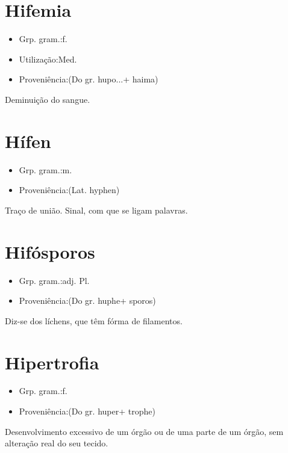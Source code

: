 \documentclass{article}
\begin{document}
\section{Hifemia}
\begin{itemize}
\item {Grp. gram.:f.}
\end{itemize}
\begin{itemize}
\item {Utilização:Med.}
\end{itemize}
\begin{itemize}
\item {Proveniência:(Do gr. \textunderscore hupo...\textunderscore  + \textunderscore haima\textunderscore )}
\end{itemize}
Deminuição do sangue.
\section{Hífen}
\begin{itemize}
\item {Grp. gram.:m.}
\end{itemize}
\begin{itemize}
\item {Proveniência:(Lat. \textunderscore hyphen\textunderscore )}
\end{itemize}
Traço de união.
Sinal, com que se ligam palavras.
\section{Hifósporos}
\begin{itemize}
\item {Grp. gram.:adj. Pl.}
\end{itemize}
\begin{itemize}
\item {Proveniência:(Do gr. \textunderscore huphe\textunderscore  + \textunderscore sporos\textunderscore )}
\end{itemize}
Diz-se dos líchens, que têm fórma de filamentos.
\section{Hipertrofia}
\begin{itemize}
\item {Grp. gram.:f.}
\end{itemize}
\begin{itemize}
\item {Proveniência:(Do gr. \textunderscore huper\textunderscore  + \textunderscore trophe\textunderscore )}
\end{itemize}
Desenvolvimento excessivo de um órgão ou de uma parte de um órgão, sem alteração real do seu tecido.
\end{document}
